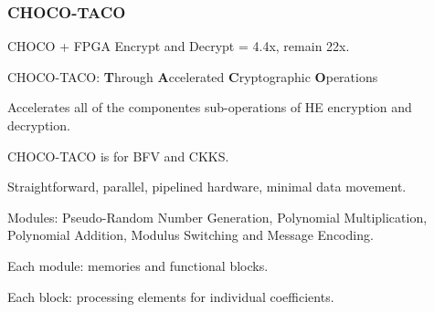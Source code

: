 \documentclass[10pt]{beamer}
\begin{document}
\begin{frame}
\frametitle{CHOCO-TACO}
CHOCO + FPGA Encrypt and Decrypt = 4.4x, remain 22x.
    \vspace{-0.2cm}

    \pause
CHOCO-TACO: \textbf{T}hrough \textbf{A}ccelerated \textbf{C}ryptographic \textbf{O}perations
    \vspace{-0.2cm}

Accelerates all of the componentes sub-operations of HE encryption and decryption.
    \vspace{-0.2cm}

\pause
CHOCO-TACO is for BFV and CKKS.
    \vspace{-0.2cm}


 Straightforward, parallel, pipelined hardware, minimal data movement.
    \vspace{-0.2cm}

\pause

 Modules: Pseudo-Random Number Generation, Polynomial Multiplication, Polynomial Addition, Modulus Switching and Message Encoding.
    \vspace{-0.2cm}

 Each module: memories and functional blocks.
    \vspace{-0.2cm}

Each block: processing elements for individual coefficients.


\end{frame}

\end{document}
